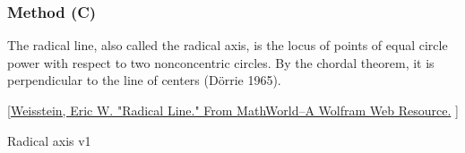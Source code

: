 \newpage
\subsubsection{Method (C)} %
\label{ssub:method_imeth_circle_radical__axis_c}

The radical line, also called the radical axis, is the locus of points of equal circle power with respect to two nonconcentric circles. By the chordal theorem, it is perpendicular to the line of centers (Dörrie 1965).

 [\href{https://mathworld.wolfram.com/RadicalLine.html}{Weisstein, Eric W. "Radical Line." From MathWorld--A Wolfram Web Resource.} ]

\vspace{6pt}
Radical axis v1
\label{par:radical_axis_v1}

